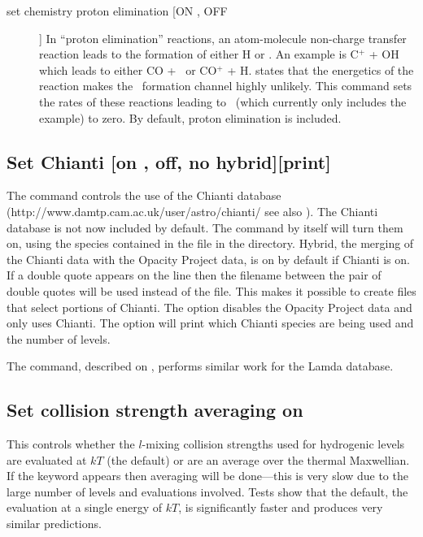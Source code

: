 \begin{description}
\item[set chemistry proton elimination  [ON , OFF]]  In ``proton elimination''
reactions, an atom-molecule non-charge transfer reaction leads to the
formation of either H or \hplus.
An example is C$^+$ + OH which leads to either
CO + \hplus\ or CO$^+$ + H.  \citet{Huntress1977} states that the energetics of the
reaction makes the \hplus\ formation channel highly unlikely.
This command sets
the rates of these reactions leading to \hplus\ (which currently only includes
the example) to zero.
By default, proton elimination is included.
\end{description}

\subsection{Set Chianti [on , off, no hybrid][print]}
\label{sec:SetChianti}
The command controls the use of the Chianti database 
(http://www.damtp.cam.ac.uk/user/astro/chianti/
see also \citet{DereChianti09}).  
The Chianti database is not now included by default.  
The  command by itself will turn them on,
using the species contained in the
 file in the 
 directory.
Hybrid, the merging of the Chianti data with the Opacity Project data, 
is on by default if Chianti is on.
If a double quote appears on the line then the filename
between the pair of double quotes will be used instead of
the  file.
This makes it possible to create  files that select portions
of Chianti.
The  option disables the Opacity Project data and only uses Chianti.
The  option will print which Chianti species are being used and the number of levels.  

The  command, described on \pageref{sec:SetLamda},
performs similar work for the Lamda database.


\subsection{Set collision strength averaging on}

This controls whether the $l$-mixing collision strengths
used for hydrogenic
levels are evaluated at $kT$ (the default) or are an average over
the thermal Maxwellian.
If the keyword  appears then averaging will be
done---this
is very slow due to the large number of levels and evaluations involved.
Tests show that the default, the evaluation at a single energy of $kT$, is
significantly faster and produces very similar predictions.

